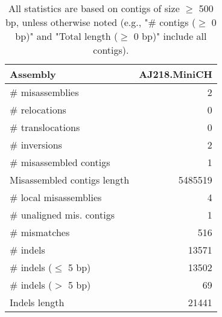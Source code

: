 \documentclass[12pt,a4paper]{article}
\begin{document}
\begin{table}[ht]
\begin{center}
\caption{All statistics are based on contigs of size $\geq$ 500 bp, unless otherwise noted (e.g., "\# contigs ($\geq$ 0 bp)" and "Total length ($\geq$ 0 bp)" include all contigs).}
\begin{tabular}{|l*{1}{|r}|}
\hline
Assembly & AJ218.MiniCH \\ \hline
\# misassemblies & 2 \\ \hline
\hspace{5mm}\# relocations & 0 \\ \hline
\hspace{5mm}\# translocations & 0 \\ \hline
\hspace{5mm}\# inversions & 2 \\ \hline
\# misassembled contigs & 1 \\ \hline
Misassembled contigs length & 5485519 \\ \hline
\# local misassemblies & 4 \\ \hline
\# unaligned mis. contigs & 1 \\ \hline
\# mismatches & 516 \\ \hline
\# indels & 13571 \\ \hline
\hspace{5mm}\# indels ($\leq$ 5 bp) & 13502 \\ \hline
\hspace{5mm}\# indels ($>$ 5 bp) & 69 \\ \hline
Indels length & 21441 \\ \hline
\end{tabular}
\end{center}
\end{table}
\end{document}
